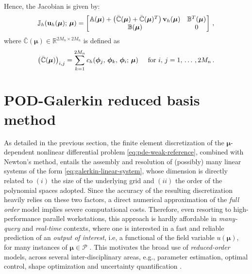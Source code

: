 \documentclass[12pt, a4paper, twoside, openright, notitlepage]{report}
\numberwithin{equation}{chapter}
\theoremstyle{theorem}
\theoremstyle{definition}
\theoremstyle{remark}
\theoremstyle{proposition}
\numberwithin{figure}{chapter}
\newcommand{\bg}[1]{\boldsymbol{#1}}
\begin{document}
		Hence, the Jacobian is given by:
		\begin{equation*}
			\label{eq:ns-jacobian}
			\mathbb{J}_h(\mathbf{u}_h(\bg{\mu}); \, \bg{\mu}) =
			\begin{bmatrix}
			\hspace*{-0.15cm}
			\begin{array}{cc} 
				\mathbb{A}(\bg{\mu}) + \big( \bar{\mathbb{C}}(\bg{\mu}) + \bar{\mathbb{C}}(\bg{\mu})^T \big) \, \mathbf{v}_h(\bg{\mu}) & \mathbb{B}^T(\bg{\mu}) \\
				\mathbb{B}(\bg{\mu}) & 0
			\end{array} 
			\hspace*{-0.15cm}
			\end{bmatrix} \, ,
		\end{equation*}
		where $\bar{\mathbb{C}}(\bg{\mu}) \in \mathbb{R}^{2 M_n \times 2 M_n}$ is defined as
		\begin{equation*}
			\big( \bar{\mathbb{C}}(\bg{\mu}) \big)_{i,j} = \sum_{k = 1}^{2 M_n} c_h(\bg{\phi}_j, \, \bg{\phi}_k, \, \bg{\phi}_i; \, \bg{\mu}) \hspace*{0.5cm} \text{for $i, \, j = 1, \, \ldots \, , 2 M_n$} \, .
		\end{equation*}
		
	\vspace*{0.1cm}
		
	\section{POD-Galerkin reduced basis method}
	\label{section:POD-Galerkin reduced basis method}
		
		As detailed in the previous section, the finite element discretization of the $\bg{\mu}$-dependent nonlinear differential problem \eqref{eq:pde-weak-reference}, combined with Newton's method, entails the assembly and resolution of (possibly) many linear systems of the form \eqref{eq:galerkin-linear-system}, whose dimension is directly related to $(i)$ the size of the underlying grid and $(ii)$ the order of the polynomial spaces adopted. Since the accuracy of the resulting discretization heavily relies on these two factors, a direct numerical approximation of the \emph{full order} model implies severe computational costs. Therefore, even resorting to high-performance parallel workstations, this approach is hardly affordable in \emph{many-query} and \emph{real-time} contexts, where one is interested in a fast and reliable prediction of an \emph{output of interest}, i.e, a functional of the field variable $u(\bg{\mu})$, for many instances of $\bg{\mu} \in \mathcal{P}$ \cite{Dep08}. This motivates the broad use of \emph{reduced-order} models, across several inter-disciplinary areas, e.g., parameter estimation, optimal control, shape optimization and uncertainty quantification \cite{HSR16, QMN15}. 
		
\end{document}
